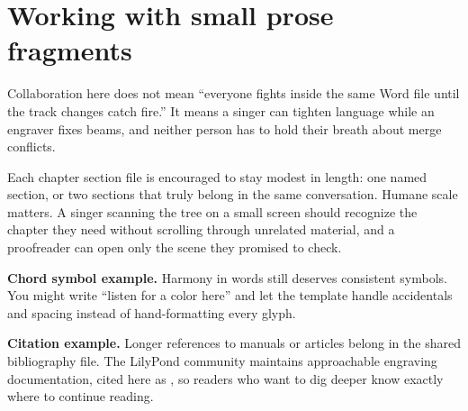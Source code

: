 \section{Working with small prose fragments}

Collaboration here does not mean ``everyone fights inside the same Word file until the track changes catch fire.'' It means a singer can tighten language while an engraver fixes beams, and neither person has to hold their breath about merge conflicts.

Each chapter section file is encouraged to stay modest in length: one named section, or two sections that truly belong in the same conversation. Humane scale matters. A singer scanning the tree on a small screen should recognize the chapter they need without scrolling through unrelated material, and a proofreader can open only the scene they promised to check.

\textbf{Chord symbol example.} Harmony in words still deserves consistent symbols. You might write ``listen for a  color here'' and let the template handle accidentals and spacing instead of hand-formatting every glyph.

\textbf{Citation example.} Longer references to manuals or articles belong in the shared bibliography file. The LilyPond community maintains approachable engraving documentation, cited here as \cite{lilypondDoc}, so readers who want to dig deeper know exactly where to continue reading.
